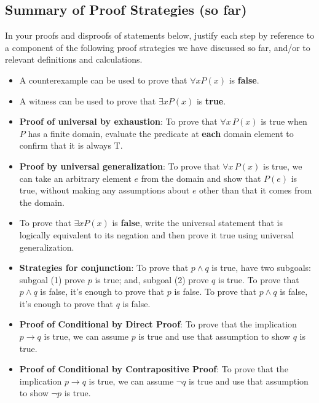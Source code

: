 \documentclass[12pt, oneside]{article}
\begin{document}
\subsection*{Summary of Proof Strategies (so far)}
In your proofs and disproofs of statements below, justify each  step
by reference to  a component of the  following proof  strategies
we  have discussed so far, and/or to relevant definitions and calculations.
\begin{itemize}
    \item A counterexample can be used to prove that  $\forall x P(x)$ is {\bf false}.
    \item  A witness can be used  to  prove that  $\exists x P(x)$ is {\bf true}.
    \item {\bf Proof of universal by exhaustion}: To prove that $\forall x \, P(x)$
is true when $P$ has a finite domain, evaluate the predicate at {\bf each} domain element to confirm that it is always T.
    \item  {\bf Proof by universal generalization}: To prove that $\forall x \, P(x)$
is true, we can take an arbitrary element $e$ from the domain and show that $P(e)$ is true, without making any assumptions about $e$ other than that it comes from the domain.
    \item To  prove  that $\exists x P(x)$ is {\bf false}, write the universal statement that is logically equivalent to its negation and then prove it true using universal generalization.
    \item {\bf Strategies for conjunction}: To prove that $p \land q$ is true, have two subgoals: subgoal (1) prove $p$ 
is  true; and, subgoal (2) prove $q$ is true. To prove that $p \land q$ is false, it's enough to prove that $p$ is false.
 To prove that $p \land q$ is false, it's enough to prove that $q$ is false.
    \item {\bf Proof of Conditional by Direct Proof}: To prove that the implication $p \to q$ is true, we can assume $p$ is true and use that assumption to show $q$ is true.
    \item {\bf Proof of Conditional by Contrapositive Proof}: To prove that the implication $p \to q$ is true, we can assume $\neg q$ is true and use that assumption to show $\neg p$ is true.
   
\end{itemize}


\newpage
\end{document}
